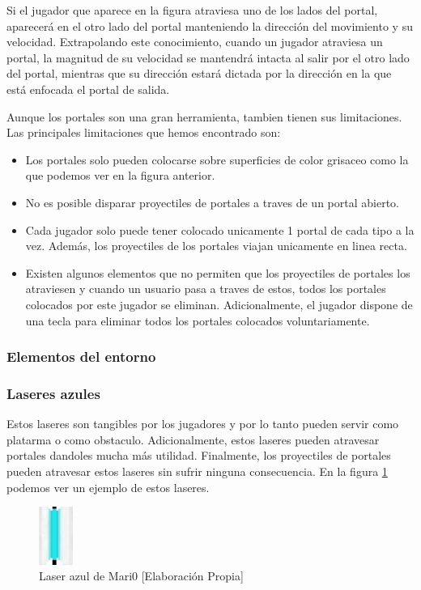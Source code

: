 Si el jugador que aparece en la figura atraviesa uno de los lados del portal, aparecerá en el otro lado del portal manteniendo la dirección del movimiento y su velocidad. Extrapolando este conocimiento, cuando un jugador atraviesa un portal, la magnitud de su velocidad se mantendrá intacta al salir por el otro lado del portal, mientras que su dirección estará dictada por la dirección en la que está enfocada el portal de salida.

Aunque los portales son una gran herramienta, tambien tienen sus limitaciones. Las principales limitaciones que hemos encontrado son:

\begin{itemize}
    \item Los portales solo pueden colocarse sobre superficies de color grisaceo como la que podemos ver en la figura anterior.
    \item No es posible disparar proyectiles de portales a traves de un portal abierto.
    \item Cada jugador solo puede tener colocado unicamente 1 portal de cada tipo a la vez. Además, los proyectiles de los portales viajan unicamente en linea recta.
    \item Existen algunos elementos que no permiten que los proyectiles de portales los atraviesen y cuando un usuario pasa a traves de estos, todos los portales colocados por este jugador se eliminan. Adicionalmente, el jugador dispone de una tecla para eliminar todos los portales colocados voluntariamente.
\end{itemize}


\subsubsection{Elementos del entorno}

\subsubsection*{Laseres azules}

Estos laseres son tangibles por los jugadores y por lo tanto pueden servir como platarma o como obstaculo. Adicionalmente, estos laseres pueden atravesar portales dandoles mucha más utilidad. Finalmente, los proyectiles de portales pueden atravesar estos laseres sin sufrir ninguna consecuencia. En la figura \ref {fig:laser-azul} podemos ver un ejemplo de estos laseres.

\begin{figure}[h]
    \centering
    \includegraphics[width=0.1\textwidth]{img/laser-azul.png}
    \caption{Laser azul de Mari0 [Elaboración Propia]}
    \label{fig:laser-azul}
\end{figure}

